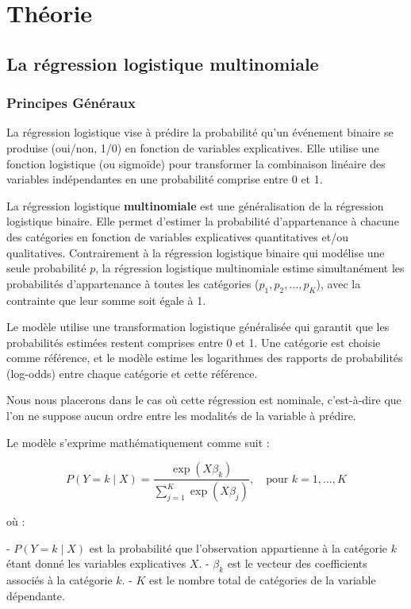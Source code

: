\documentclass[10pt,french]{report}
\begin{document}
	\chapter{Théorie}
	
	\section{La régression logistique multinomiale}
	\subsection{Principes Généraux}
	La régression logistique vise à prédire la probabilité qu'un événement binaire se produise (oui/non, 1/0) en fonction de variables explicatives. Elle utilise une fonction logistique (ou sigmoïde) pour transformer la combinaison linéaire des variables indépendantes en une probabilité comprise entre 0 et 1.
	
	La régression logistique \textbf{multinomiale} est une généralisation de la régression logistique binaire. Elle permet d'estimer la probabilité d'appartenance à chacune des catégories en fonction de variables explicatives quantitatives et/ou qualitatives. Contrairement à la régression logistique binaire qui modélise une seule probabilité $p$, la régression logistique multinomiale estime simultanément les probabilités d'appartenance à toutes les catégories ($p_1, p_2, ..., p_K$), avec la contrainte que leur somme soit égale à 1.
	
	Le modèle utilise une transformation logistique généralisée qui garantit que les probabilités estimées restent comprises entre 0 et 1. Une catégorie est choisie comme référence, et le modèle estime les logarithmes des rapports de probabilités (log-odds) entre chaque catégorie et cette référence.
	
	Nous nous placerons dans le cas où cette régression est nominale, c'est-à-dire que l'on ne suppose aucun ordre entre les modalités de la variable à prédire.
	
	Le modèle s'exprime mathématiquement comme suit :
	
	\[
	P(Y = k \mid X) = \frac{\exp(X\beta_k)}{\sum_{j=1}^K \exp(X\beta_j)}, \quad \text{pour } k = 1, \dotsc, K
	\]
	
	où :
	
	- \( P(Y = k \mid X) \) est la probabilité que l'observation appartienne à la catégorie \( k \) étant donné les variables explicatives \( X \).
	- \( \beta_k \) est le vecteur des coefficients associés à la catégorie \( k \).
	- \( K \) est le nombre total de catégories de la variable dépendante.
	
\end{document}
